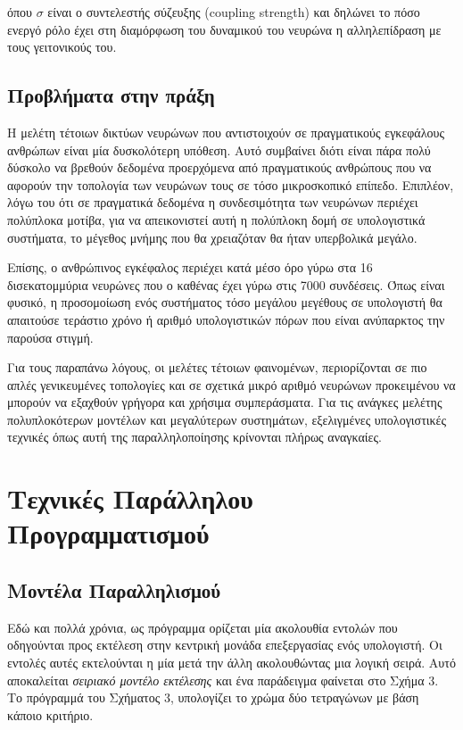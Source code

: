 \documentclass[12pt,a4paper]{article}
\begin{document}
\noindent όπου $\sigma$ είναι ο συντελεστής σύζευξης (coupling strength) και δηλώνει το πόσο ενεργό ρόλο έχει στη διαμόρφωση του δυναμικού του νευρώνα η αλληλεπίδραση με τους γειτονικούς του.

\subsection{Προβλήματα στην πράξη}

Η μελέτη τέτοιων δικτύων νευρώνων που αντιστοιχούν σε πραγματικούς εγκεφάλους ανθρώπων είναι μία δυσκολότερη υπόθεση. Αυτό συμβαίνει διότι είναι πάρα πολύ δύσκολο να βρεθούν δεδομένα προερχόμενα από πραγματικούς ανθρώπους που να αφορούν την τοπολογία των νευρώνων τους σε τόσο μικροσκοπικό επίπεδο. Επιπλέον, λόγω του ότι σε πραγματικά δεδομένα η συνδεσιμότητα των νευρώνων περιέχει πολύπλοκα μοτίβα, για να απεικονιστεί αυτή η πολύπλοκη δομή σε υπολογιστικά συστήματα, το μέγεθος μνήμης που θα χρειαζόταν θα ήταν υπερβολικά μεγάλο.

Επίσης, ο ανθρώπινος εγκέφαλος περιέχει κατά μέσο όρο γύρω στα 16 δισεκατομμύρια νευρώνες που ο καθένας έχει γύρω στις 7000 συνδέσεις. Όπως είναι φυσικό, η προσομοίωση ενός συστήματος τόσο μεγάλου μεγέθους σε υπολογιστή θα απαιτούσε τεράστιο χρόνο ή αριθμό υπολογιστικών πόρων που είναι ανύπαρκτος την παρούσα στιγμή.

Για τους παραπάνω λόγους, οι μελέτες τέτοιων φαινομένων, περιορίζονται σε πιο απλές γενικευμένες τοπολογίες και σε σχετικά μικρό αριθμό νευρώνων προκειμένου να μπορούν να εξαχθούν γρήγορα και χρήσιμα συμπεράσματα. Για τις ανάγκες μελέτης πολυπλοκότερων μοντέλων και μεγαλύτερων συστημάτων, εξελιγμένες υπολογιστικές τεχνικές όπως αυτή της παραλληλοποίησης κρίνονται πλήρως αναγκαίες.

\newpage

\section{Τεχνικές Παράλληλου Προγραμματισμού}

\subsection{Μοντέλα Παραλληλισμού}
Εδώ και πολλά χρόνια, ως πρόγραμμα ορίζεται μία ακολουθία εντολών που οδηγούνται προς εκτέλεση στην κεντρική μονάδα επεξεργασίας ενός υπολογιστή. Οι εντολές αυτές εκτελούνται η μία μετά την άλλη ακολουθώντας μια λογική σειρά. Αυτό αποκαλείται \textit{σειριακό μοντέλο εκτέλεσης} και ένα παράδειγμα φαίνεται στο Σχήμα 3. Το πρόγραμμά του Σχήματος 3, υπολογίζει το χρώμα δύο τετραγώνων με βάση κάποιο κριτήριο.
\end{document}
